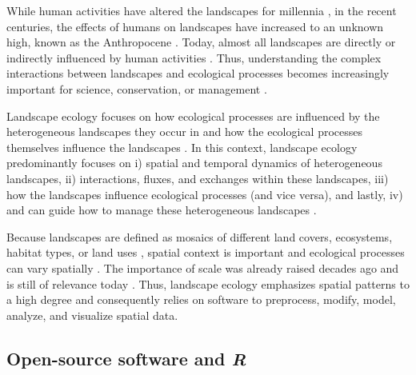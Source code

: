 \documentclass[smallextended]{svjour3}       %
\begin{document}
While human activities have altered the landscapes for millennia \cite{Ellis2011,Ellis2015}, in the recent centuries, the effects of humans on landscapes have increased to an unknown high, known as the Anthropocene \cite{Crutzen2002}.
Today, almost all landscapes are directly or indirectly influenced by human activities \cite{Vitousek1997}.
Thus, understanding the complex interactions between landscapes and ecological processes becomes increasingly important for science, conservation, or management \cite{With2019}.

Landscape ecology focuses on how ecological processes are influenced by the heterogeneous landscapes they occur in and how the ecological processes themselves influence the landscapes \cite{Turner1989,Turner2005,With2019}.
In this context, landscape ecology predominantly focuses on i) spatial and temporal dynamics of heterogeneous landscapes, ii) interactions, fluxes, and exchanges within these landscapes, iii) how the landscapes influence ecological processes (and vice versa), and lastly, iv) and can guide how to manage these heterogeneous landscapes \cite{Risser1984,Turner1989}.

Because landscapes are defined as mosaics of different land covers, ecosystems, habitat types, or land uses \cite{Forman1986,Forman1995,Wiens1995}, spatial context is important and ecological processes can vary spatially \cite{With2019}.
The importance of scale was already raised decades ago \cite{Wiens1989,Levin1992,Jelinski1996} and is still of relevance today \cite{Simova2012,Estes2018}.
Thus, landscape ecology emphasizes spatial patterns to a high degree \cite{Risser1984} and consequently relies on software to preprocess, modify, model, analyze, and visualize spatial data.

\hypertarget{sec:open_source}{%
\subsection{\texorpdfstring{Open-source software and \emph{R}}{Open-source software and R}}\label{sec:open_source}}
\end{document}
